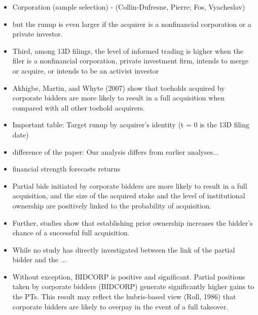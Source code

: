 \documentclass[12pt]{article}
\begin{document}
    \begin{itemize}

        \item Corporation (sample selection) - (Collin-Dufresne, Pierre; Fos, Vyacheslav)

        \item but the runup is even larger if the acquirer is a nonfinancial corporation or a private investor.\citep{Brigida2012}

        \item Third, among 13D filings, the level of informed trading is higher when the filer is a nonfinancial corporation, private investment firm, intends to merge or acquire, or intends to be an activist investor \citep{Brigida2012}

        \item Akhigbe, Martin, and Whyte (2007) show that toeholds acquired by corporate bidders are more likely to result in a full acquisition when compared with all other toehold acquirers.\citep{Brigida2012}

        \item Important table: Target runup by acquirer's identity (t = 0 is the 13D filing date) \citep{Brigida2012}

        \item difference of the paper: Our analysis differs from earlier analyses...\citep{Brigida2012}

        \item financial strength forecasts returns \citep{Choi2012}

        \item Partial bids initiated by corporate bidders are more likely to result in a full acquisition, and the size of the acquired stake and the level of institutional ownership are positively linked to the probability of acquisition. \citep{Akhigbe2007}

        \item Further, studies show that establishing prior ownership increases the bidder’s chance of a successful full acquisition. \citep{Akhigbe2007}

        \item While no study has directly investigated between the link of the partial bidder and the ... \citep{Akhigbe2007}

        \item Without exception, BIDCORP is positive and significant. Partial positions taken by corporate bidders (BIDCORP) generate significantly higher gains to the PTs. This result may reflect the hubris-based view (Roll, 1986) that corporate bidders are likely to overpay in the event of a full takeover. \citep{Akhigbe2007}

       
    \end{itemize}
\end{document}
